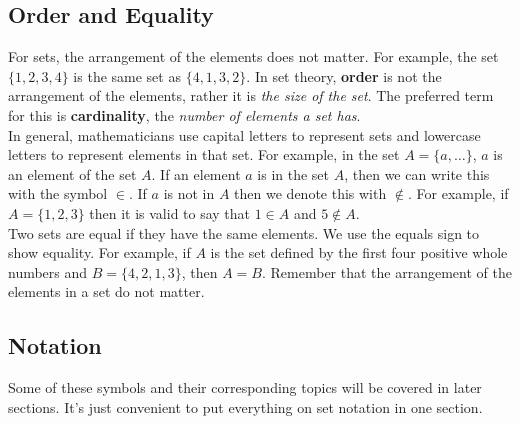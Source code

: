 \documentclass{article}
\begin{document}
        \subsection{Order and Equality}
            For sets, the arrangement of the elements does not matter. For example, the set
            $\{1,2,3,4\}$ is the same set as $\{4,1,3,2\}$. In set theory, \textbf{order} is not the
            arrangement of the elements, rather it is \textit{the size of the set}. The preferred
            term for this is \textbf{cardinality}, the \textit{number of elements a set has}. \\

            \noindent In general, mathematicians use capital letters to represent sets and lowercase
            letters to represent elements in that set. For example, in the set $A=\{a,\dots\}$, $a$
            is an element of the set $A$. If an element $a$ is in the set $A$, then we can write this
            with the symbol $\in$. If $a$ is not in $A$ then we denote this with $\notin$. For
            example, if $A=\{1,2,3\}$ then it is valid to say that $1\in A$ and $5\notin A$. \\

            \noindent Two sets are equal if they have the same elements. We use the equals sign to
            show equality. For example, if $A$ is the set defined by the first four positive whole
            numbers and $B=\{4,2,1,3\}$, then $A=B$. Remember that the arrangement of the elements
            in a set do not matter.


        \pagebreak
        \subsection{Notation}
            Some of these symbols and their corresponding topics will be covered in later sections.
            It's just convenient to put everything on set notation in one section.
\end{document}
